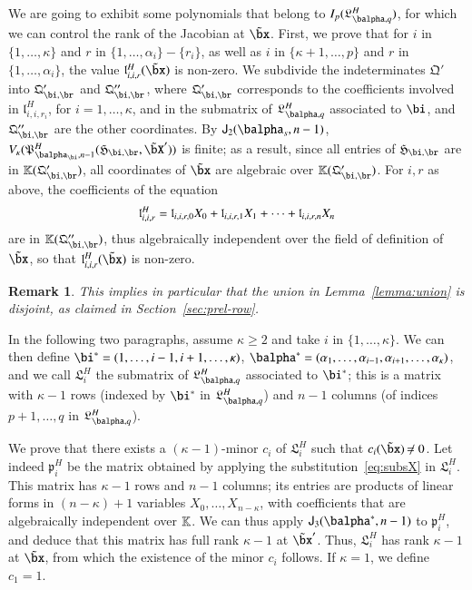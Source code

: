 \documentclass[amsthm]{elsart}
\newtheorem{remark}[definition]{Remark}
\begin{document}
We are going to exhibit some polynomials that belong to
$I_p(\mathfrak{L}^H_{\balpha,q})$, for which we can control the rank
of the Jacobian at $\tilde\bx$. First, we prove that for $i$ in
$\{1,\dots,\kappa\}$ and $r$ in $\{1,\dots,\alpha_i\}-\{r_i\}$, as
well as $i$ in $\{\kappa+1,\dots,p\}$ and $r$ in
$\{1,\dots,\alpha_i\}$, the value $\mathfrak{l}^H_{i,i,r}(\tilde\bx)$
is non-zero.  We subdivide the indeterminates $\mathfrak{Q}'$ into
$\mathfrak{Q}'_{\bi,\br}$ and $\mathfrak{Q}''_{\bi,\br}$, where
$\mathfrak{Q}'_{\bi,\br}$ corresponds to the coefficients involved in
$\mathfrak{l}^H_{i,i,r_i}$, for $i=1,\dots,\kappa$, and in the
submatrix of $\mathfrak{L}^H_{\balpha,q}$ associated to $\bi$, and
$\mathfrak{Q}''_{\bi,\br}$ are the other coordinates.  By
$\assI_2(\balpha_s,n-1)$,
$V_\kappa(\mathfrak{P}^H_{\balpha_\bi,n-1}(\mathfrak{H}_{\bi,\br},\tilde\bX'))$
is finite; as a result, since all entries of $\mathfrak{H}_{\bi,\br}$ 
are in $\KK(\mathfrak{Q}'_{\bi,\br})$,
all coordinates of $\tilde\bx$ are algebraic
over $\KK(\mathfrak{Q}'_{\bi,\br})$. For $i,r$ as above, the
coefficients of the equation
$$\mathfrak{l}^H_{i,i,r} = \frak{l}_{i,i,r,0} X_0+ \frak{l}_{i,i,r,1}
X_1 +\cdots + \frak{l}_{i,i,r,n} X_n$$ are
in  $\KK(\mathfrak{Q}''_{\bi,\br})$, thus algebraically independent
over the field of definition of $\tilde\bx$, so that $\mathfrak{l}^H_{i,i,r}(\tilde\bx)$
is non-zero.

\begin{remark}\label{remark:disjoint}
  This implies in particular that the union in Lemma~\ref{lemma:union} is disjoint,
as claimed in Section~\ref{sec:prel-row}.
\end{remark}

In the following two paragraphs, assume $\kappa \ge 2$
and take $i$ in $\{1,\dots,\kappa\}$. We can then define
$\bi^*=(1,\dots,i-1,i+1,\dots,\kappa)$,
$\balpha^*=(\alpha_1,\dots,\alpha_{i-1},\alpha_{i+1},\dots,\alpha_\kappa)$,
and we call $\mathfrak{L}^H_i$ the submatrix of
$\mathfrak{L}^H_{\balpha,q}$ associated to $\bi^*$; this is a matrix
with $\kappa-1$ rows (indexed by $\bi^*$ in
$\mathfrak{L}^H_{\balpha,q}$) and $n-1$ columns (of indices $p+1,\dots,q$ 
in $\mathfrak{L}^H_{\balpha,q}$).

We prove that there exists a $(\kappa-1)$-minor $c_i$ of
$\mathfrak{L}^H_i$ such that $c_i(\tilde\bx)\ne 0$.  Let indeed
$\mathfrak{p}^H_i$ be the matrix obtained by applying the
substitution~\eqref{eq:subsX} in $\mathfrak{L}^H_i$. This matrix 
has $\kappa-1$ rows and $n-1$ columns; its entries are products of
linear forms in $(n-\kappa)+1$ variables $X_0,\dots,X_{n-\kappa}$,
with coefficients that are algebraically
independent over $\mathbb{K}$. We can thus apply $\assI_3(\balpha^*,n-1)$ to
$\mathfrak{p}_{i}^H$, and deduce that this matrix has full rank $\kappa-1$
at $\tilde\bx'$.  Thus, $\mathfrak{L}^H_i$ has rank $\kappa-1$ at
$\tilde\bx$, from which the existence of the minor $c_i$ follows.
If $\kappa=1$, we define $c_1=1$.
\end{document}
